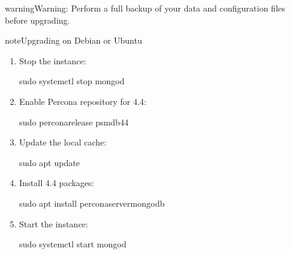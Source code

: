 \documentclass[letterpaper,10pt,english]{sphinxmanual}
\begin{document}
\begin{sphinxadmonition}{warning}{Warning:}
\sphinxAtStartPar
Perform a full backup of your data and configuration files before upgrading.

\begin{sphinxadmonition}{note}{Upgrading on Debian or Ubuntu}
\begin{enumerate}
%
\item {} 
\sphinxAtStartPar
Stop the  instance:

\begin{sphinxVerbatim}[commandchars=\\\{\}]
\PYGZdl{} sudo systemctl stop mongod
\end{sphinxVerbatim}

\item {} 
\sphinxAtStartPar
Enable Percona repository for  4.4:

\begin{sphinxVerbatim}[commandchars=\\\{\}]
\PYGZdl{} sudo percona\PYGZhy{}release  psmdb\PYGZhy{}44
\end{sphinxVerbatim}

\item {} 
\sphinxAtStartPar
Update the local cache:

\begin{sphinxVerbatim}[commandchars=\\\{\}]
\PYGZdl{} sudo apt update
\end{sphinxVerbatim}

\item {} 
\sphinxAtStartPar
Install  4.4 packages:

\begin{sphinxVerbatim}[commandchars=\\\{\}]
\PYGZdl{} sudo apt install percona\PYGZhy{}server\PYGZhy{}mongodb
\end{sphinxVerbatim}

\item {} 
\sphinxAtStartPar
Start the  instance:

\begin{sphinxVerbatim}[commandchars=\\\{\}]
\PYGZdl{} sudo systemctl start mongod
\end{sphinxVerbatim}


\end{enumerate}
\end{sphinxadmonition}
\end{sphinxadmonition}
\end{document}
